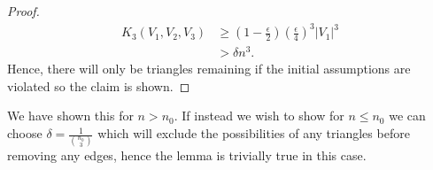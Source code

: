 \begin{proof}
\begin{align*}
	K_3\left( V_1, V_2, V_3 \right) &\ge \left( 1- \frac{\epsilon}{2} \right) \left( \frac{\epsilon}{4} \right) ^3 \left| V_1 \right| ^3\\
					&> \delta n^3
.\end{align*}
Hence, there will only be triangles remaining if the initial assumptions are violated so the claim is shown.
\end{proof}
\begin{remark}
	We have shown this for \(n > n_0\). If instead we wish to show for \(n \le n_0\) we can choose \(\delta = \frac{1}{\binom{n_0}{3}}\) which will exclude the possibilities of any triangles before removing any edges, hence the lemma is trivially true in this case.
\end{remark}

